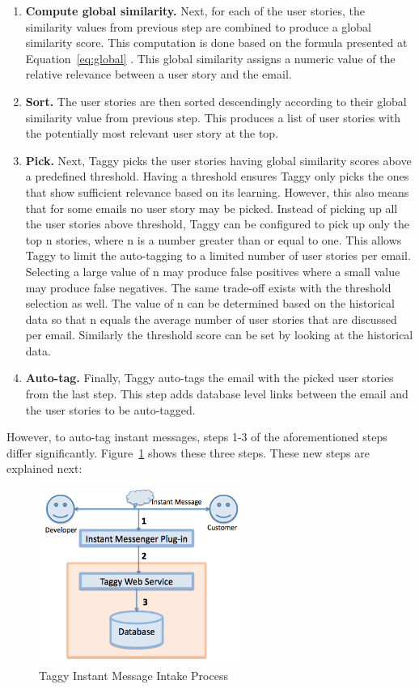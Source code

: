 \begin{enumerate}
	\item \textbf{Compute global similarity.} Next, for each of the user stories, the similarity values from previous step are combined to produce a global similarity score. This computation is done based on the formula presented at Equation~\ref{eq:global} . This global similarity assigns a numeric value of the relative relevance between a user story and the email.
	
	\item \textbf{Sort.} The user stories are then sorted descendingly according to their global similarity value from previous step. This produces a list of user stories with the potentially most relevant user story at the top.
	
	\item \textbf{Pick.} Next, Taggy picks the user stories having global similarity scores above a predefined threshold. Having a threshold ensures Taggy only picks the ones that show sufficient relevance based on its learning. However, this also means that for some emails no user story may be picked. Instead of picking up all the user stories above threshold, Taggy can be configured to pick up only the top n stories, where n is a number greater than or equal to one. This allows Taggy to limit the auto-tagging to a limited number of user stories per email. Selecting a large value of n may produce false positives where a small value may produce false negatives. The same trade-off exists with the threshold selection as well. The value of n can be determined based on the historical data so that n equals the average number of user stories that are discussed per email. Similarly the threshold score can be set by looking at the historical data.
	
	\item \textbf{Auto-tag.}	Finally, Taggy auto-tags the email with the picked user stories from the last step. This step adds database level links between the email and the user stories to be auto-tagged.
\end{enumerate}

However, to auto-tag instant messages, steps 1-3 of the aforementioned steps differ significantly. Figure~\ref{fig:im_intake} shows these three steps. These new steps are explained next:

\begin{figure}[!h]
	\centering
	\includegraphics[width=0.6\textwidth]{im_intake.png}
	\caption{Taggy Instant Message Intake Process}
	\label{fig:im_intake}
\end{figure}


